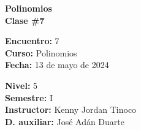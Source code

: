 \begin{center} \textbf
{
    \Large Polinomios \\ \vspace{2mm}Clase \#7
}
\end{center}

\begin{multicols}{2}
{
    \textbf{Encuentro:} 7\\
    \textbf{Curso:} Polinomios\\
    \textbf{Fecha:} 13 de mayo de 2024\\
    \begin{flushright}
        \textbf{Nivel:} 5\\
        \textbf{Semestre:} I\\
        \textbf{Instructor:} Kenny Jordan Tinoco\\
        \textbf{D. auxiliar: }José Adán Duarte
    \end{flushright}
}
\end{multicols}

\thispagestyle{first-page-style}